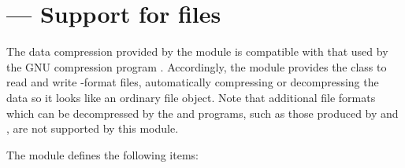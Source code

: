 \section{ ---
         Support for  files}



The data compression provided by the  module is compatible
with that used by the GNU compression program .
Accordingly, the  module provides the 
class to read and write -format files, automatically
compressing or decompressing the data so it looks like an ordinary
file object.  Note that additional file formats which can be
decompressed by the  and  programs, such 
as those produced by  and , are not
supported by this module.

The module defines the following items:

